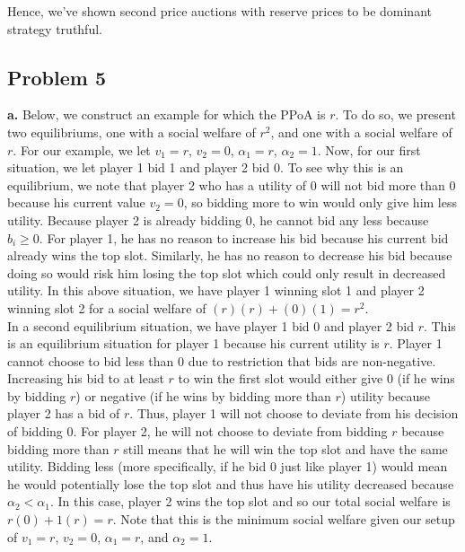 \documentclass[12 pt]{article}
\begin{document}
	\noindent Hence, we've shown second price auctions with reserve prices to be dominant strategy truthful.\\
	
	\subsection*{Problem 5}
	
	\noindent \textbf {a.} Below, we construct an example for which the PPoA is $r$. To do so, we present two equilibriums, one with a social welfare of $r^2$, and one with a social welfare of $r$. For our example, we let $v_1 = r$, $v_2 = 0$, $\alpha_1 = r$, $\alpha_2 = 1$. Now, for our first situation, we let player 1 bid 1 and player 2 bid 0. To see why this is an equilibrium, we note that player 2 who has a utility of 0 will not bid more than 0 because his current value $v_2 = 0$, so bidding more to win would only give him less utility. Because player 2 is already bidding 0, he cannot bid any less because $b_i \geq 0$. For player 1, he has no reason to increase his bid because his current bid already wins the top slot. Similarly, he has no reason to decrease his bid because doing so would risk him losing the top slot which could only result in decreased utility. In this above situation, we have player 1 winning slot 1 and player 2 winning slot 2 for a social welfare of $(r)(r) + (0)(1) = r^2$. \\
	
	\noindent In a second equilibrium situation, we have player 1 bid 0 and player 2 bid $r$. This is an equilibrium situation for player 1 because his current utility is $r$. Player 1 cannot choose to bid less than 0 due to restriction that bids are non-negative. Increasing his bid to at least $r$ to win the first slot would either give 0 (if he wins by bidding $r$) or negative (if he wins by bidding more than $r$) utility because player 2 has a bid of $r$. Thus, player 1 will not choose to deviate from his decision of bidding 0. For player 2, he will not choose to deviate from bidding $r$ because bidding more than $r$ still means that he will win the top slot and have the same utility. Bidding less (more specifically, if he bid 0 just like player 1) would mean he would potentially lose the top slot and thus have his utility decreased because $\alpha_2 < \alpha_1$. In this case, player 2 wins the top slot and so our total social welfare is $r(0) + 1(r) = r$. Note that this is the minimum social welfare given our setup of $v_1 = r$, $v_2 = 0$, $\alpha_1 = r$, and $\alpha_2 = 1$. \\
	
\end{document}
